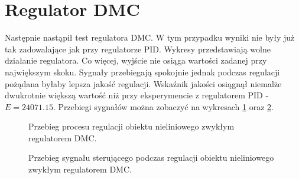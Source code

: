 \section{Regulator DMC}
Następnie nastąpił test regulatora DMC. W tym przypadku wyniki nie były już tak zadowalające jak przy regulatorze PID. Wykresy przedstawiają wolne działanie regulatora. Co więcej, wyjście nie osiąga wartości zadanej przy największym skoku. Sygnały przebiegają spokojnie jednak podczas regulacji pożądana byłaby lepsza jakość regulacji. Wskaźnik jakości osiągnął niemalże dwukrotnie większą wartość niż przy eksperymencie z regulatorem PID - $E = \num{24071.15}$. Przebiegi sygnałów można zobaczyć na wykresach \ref{reg_DMC} oraz \ref{reg_DMC_u}. 

\begin{figure}[t]
    \centering
    \caption{Przebieg procesu regulacji obiektu nieliniowego zwykłym regulatorem DMC.}
    \label{reg_DMC}
\end{figure}

\begin{figure}[b]
    \centering
    \caption{Przebieg sygnału sterującego podczas regulacji obiektu nieliniowego zwykłym regulatorem DMC.}
    \label{reg_DMC_u}
\end{figure}